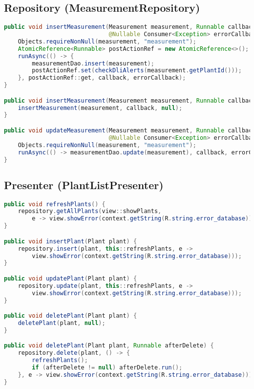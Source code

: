 \documentclass[14pt,a4paper]{report}
\begin{document}
\subsection*{Repository (MeasurementRepository)}
\begin{lstlisting}[language=Java, caption={Repository MeasurementRepository.java (Auszug)}]
public void insertMeasurement(Measurement measurement, Runnable callback,
                              @Nullable Consumer<Exception> errorCallback) {
    Objects.requireNonNull(measurement, "measurement");
    AtomicReference<Runnable> postActionRef = new AtomicReference<>();
    runAsync(() -> {
        measurementDao.insert(measurement);
        postActionRef.set(checkDliAlerts(measurement.getPlantId()));
    }, postActionRef::get, callback, errorCallback);
}

public void insertMeasurement(Measurement measurement, Runnable callback) {
    insertMeasurement(measurement, callback, null);
}

public void updateMeasurement(Measurement measurement, Runnable callback,
                              @Nullable Consumer<Exception> errorCallback) {
    Objects.requireNonNull(measurement, "measurement");
    runAsync(() -> measurementDao.update(measurement), callback, errorCallback);
}
\end{lstlisting}

\subsection*{Presenter (PlantListPresenter)}
\begin{lstlisting}[language=Java, caption={Presenter PlantListPresenter.java (Auszug)}]
public void refreshPlants() {
    repository.getAllPlants(view::showPlants,
        e -> view.showError(context.getString(R.string.error_database)));
}

public void insertPlant(Plant plant) {
    repository.insert(plant, this::refreshPlants, e ->
        view.showError(context.getString(R.string.error_database)));
}

public void updatePlant(Plant plant) {
    repository.update(plant, this::refreshPlants, e ->
        view.showError(context.getString(R.string.error_database)));
}

public void deletePlant(Plant plant) {
    deletePlant(plant, null);
}

public void deletePlant(Plant plant, Runnable afterDelete) {
    repository.delete(plant, () -> {
        refreshPlants();
        if (afterDelete != null) afterDelete.run();
    }, e -> view.showError(context.getString(R.string.error_database)));
}
\end{lstlisting}
\end{document}
